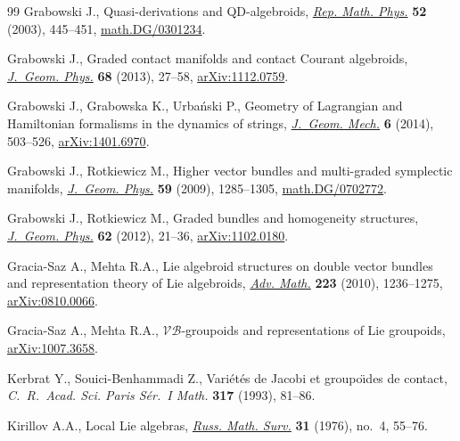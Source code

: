 \documentclass[pdftex]{sigma}
\numberwithin{equation}{section}
\begin{document}
\begin{thebibliography}{99}
Grabowski J., Quasi-derivations and {QD}-algebroids, \href{http://dx.doi.org/10.1016/S0034-4877(03)80041-1}{\textit{Rep. Math. Phys.}}
  \textbf{52} (2003), 445--451, \href{http://arxiv.org/abs/math.DG/0301234}{math.DG/0301234}.

Grabowski J., Graded contact manifolds and contact {C}ourant algebroids,
  \href{http://dx.doi.org/10.1016/j.geomphys.2013.02.001}{\textit{J.~Geom. Phys.}} \textbf{68} (2013), 27--58, \href{http://arxiv.org/abs/1112.0759}{arXiv:1112.0759}.

Grabowski J., Grabowska K., Urba{\'n}ski P., Geometry of {L}agrangian and
  {H}amiltonian formalisms in the dynamics of strings, \href{http://dx.doi.org/10.3934/jgm.2014.6.503}{\textit{J.~Geom. Mech.}}
  \textbf{6} (2014), 503--526, \href{http://arxiv.org/abs/1401.6970}{arXiv:1401.6970}.

Grabowski J., Rotkiewicz M., Higher vector bundles and multi-graded symplectic
  manifolds, \href{http://dx.doi.org/10.1016/j.geomphys.2009.06.009}{\textit{J.~Geom. Phys.}} \textbf{59} (2009), 1285--1305,
  \href{http://arxiv.org/abs/math.DG/0702772}{math.DG/0702772}.

Grabowski J., Rotkiewicz M., Graded bundles and homogeneity structures,
  \href{http://dx.doi.org/10.1016/j.geomphys.2011.09.004}{\textit{J.~Geom. Phys.}} \textbf{62} (2012), 21--36, \href{http://arxiv.org/abs/1102.0180}{arXiv:1102.0180}.

Gracia-Saz A., Mehta R.A., Lie algebroid structures on double vector bundles
  and representation theory of {L}ie algebroids, \href{http://dx.doi.org/10.1016/j.aim.2009.09.010}{\textit{Adv. Math.}}
  \textbf{223} (2010), 1236--1275, \href{http://arxiv.org/abs/0810.0066}{arXiv:0810.0066}.

Gracia-Saz A., Mehta R.A., $\mathcal{VB}$-groupoids and representations of Lie
  groupoids, \href{http://arxiv.org/abs/1007.3658}{arXiv:1007.3658}.



Kerbrat Y., Souici-Benhammadi Z., Vari\'et\'es de {J}acobi et groupo\"\i des de
  contact, \textit{C.~R.~Acad. Sci. Paris S\'er.~I Math.} \textbf{317} (1993),
  81--86.

Kirillov A.A., Local {L}ie algebras, \href{http://dx.doi.org/10.1070/RM1976v031n04ABEH001556}{\textit{Russ. Math. Surv.}} \textbf{31}
  (1976), no.~4, 55--76.


\end{thebibliography}
\end{document}
